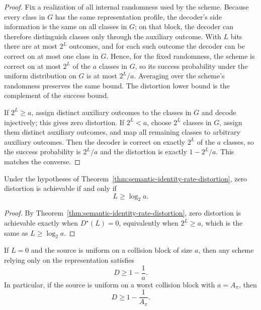\begin{proof}
Fix a realization of all internal randomness used by the scheme. Because every class in $G$ has the same representation profile, the decoder's side information is the same on all classes in $G$; on that block, the decoder can therefore distinguish classes only through the auxiliary outcome. With $L$ bits there are at most $2^L$ outcomes, and for each such outcome the decoder can be correct on at most one class in $G$. Hence, for the fixed randomness, the scheme is correct on at most $2^L$ of the $a$ classes in $G$, so its success probability under the uniform distribution on $G$ is at most $2^L/a$. Averaging over the scheme's randomness preserves the same bound. The distortion lower bound is the complement of the success bound.

If $2^L \ge a$, assign distinct auxiliary outcomes to the classes in $G$ and decode injectively; this gives zero distortion. If $2^L < a$, choose $2^L$ classes in $G$, assign them distinct auxiliary outcomes, and map all remaining classes to arbitrary auxiliary outcomes. Then the decoder is correct on exactly $2^L$ of the $a$ classes, so the success probability is $2^L/a$ and the distortion is exactly $1-2^L/a$. This matches the converse.
\end{proof}

\begin{corollary}\label{cor:zero-error-threshold-distortion}
Under the hypotheses of Theorem~\ref{thm:semantic-identity-rate-distortion}, zero distortion is achievable if and only if
\[
L \ge \log_2 a.
\]
\end{corollary}

\begin{proof}
By Theorem~\ref{thm:semantic-identity-rate-distortion}, zero distortion is achievable exactly when $D^\star(L)=0$, equivalently when $2^L \ge a$, which is the same as $L \ge \log_2 a$.
\end{proof}

\begin{corollary}\label{cor:zero-budget-error-floor}
If $L=0$ and the source is uniform on a collision block of size $a$, then any scheme relying only on the representation satisfies
\[
D \ge 1 - \frac{1}{a}.
\]
In particular, if the source is uniform on a worst collision block with $a=A_\pi$, then
\[
D \ge 1 - \frac{1}{A_\pi}.
\]
\end{corollary}


